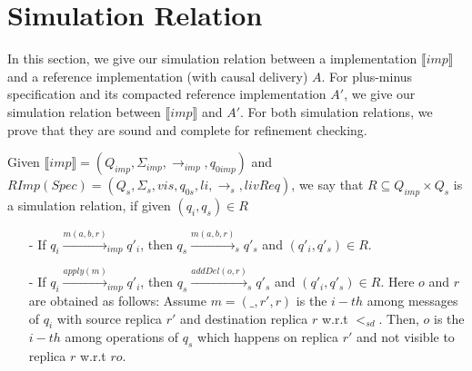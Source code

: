 \forget
{
\section{Simulation Relation}
\label{sec:simulation relation}

In this section, we give our simulation relation between a implementation $\llbracket imp \rrbracket$ and a reference implementation (with causal delivery) $A$. For plus-minus specification and its compacted reference implementation $A'$, we give our simulation relation between $\llbracket imp \rrbracket$ and $A'$. For both simulation relations, we prove that they are sound and complete for refinement checking.

Given $\llbracket imp \rrbracket = (Q_{imp},\Sigma_{imp},\rightarrow_{imp},q_{0imp})$ and $RImp(Spec) = (Q_s,\Sigma_s,vis,q_{0s},li,\rightarrow_s,livReq)$, we say that $R \subseteq Q_{imp} \times Q_s$ is a simulation relation, if given $(q_i,q_s) \in R$

\begin{itemize}
\setlength{\itemsep}{0.5pt}
\item[-] If $q_i {\xrightarrow{m(a,b,r)}}_{imp} q'_i$, then $q_s {\xrightarrow{m(a,b,r)}}_s q'_s$ and $(q'_i,q'_s) \in R$.

\item[-] If $q_i {\xrightarrow{apply(m)}}_{imp} q'_i$, then $q_s {\xrightarrow{addDel(o,r)}}_s q'_s$ and $(q'_i,q'_s) \in R$. Here $o$ and $r$ are obtained as follows: Assume $m=(\_,r',r)$ is the $i-th$ among messages of $q_i$ with source replica $r'$ and destination replica $r$ w.r.t $<_{sd}$. Then, $o$ is the $i-th$ among operations of $q_s$ which happens on replica $r'$ and not visible to replica $r$ w.r.t $ro$.
\end{itemize}




}
